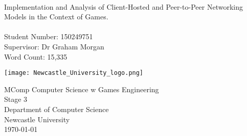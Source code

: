 \begin{titlepage}
  \begin{center}
    \makeatletter
    \vspace*{1cm}
    \Huge
    \textbf{\@title}\\
    \vspace*{0.5cm}
    \large
    Implementation and Analysis of Client-Hosted and Peer-to-Peer Networking Models in the Context of Games.\\


    \vspace*{2cm}
    \Large
    \textbf{\@author}\\
    \large
    Student Number: 150249751\\
    Supervisor: Dr Graham Morgan\\

    \vspace*{2cm}
    Word Count: 15,335\\

    \vfill

    \texttt{[image: Newcastle\_University\_logo.png]}

    \Large
    MComp Computer Science w Games Engineering\\
    Stage 3\\
    \vspace*{1cm}
    Department of Computer Science\\
    Newcastle University\\
    \today
    \makeatother
  \end{center}
\end{titlepage}
